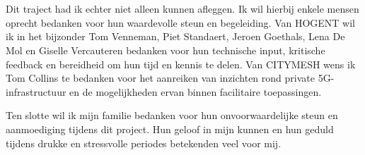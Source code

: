 
\chapter*{}%
\label{ch:voorwoord}



Dit traject had ik echter niet alleen kunnen afleggen. Ik wil hierbij enkele mensen oprecht bedanken voor hun waardevolle steun en begeleiding. Van HOGENT wil ik in het bijzonder Tom Venneman, Piet Standaert, Jeroen Goethals, Lena De Mol en Giselle Vercauteren bedanken voor hun technische input, kritische feedback en bereidheid om hun tijd en kennis te delen. Van CITYMESH wens ik Tom Collins te bedanken voor het aanreiken van inzichten rond private 5G-infrastructuur en de mogelijkheden ervan binnen facilitaire toepassingen.

Ten slotte wil ik mijn familie bedanken voor hun onvoorwaardelijke steun en aanmoediging tijdens dit project. Hun geloof in mijn kunnen en hun geduld tijdens drukke en stressvolle periodes betekenden veel voor mij.

